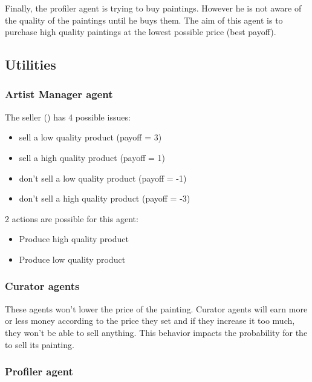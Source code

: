\documentclass[a4paper,11pt]{article}
\begin{document}
  Finally, the profiler agent is trying to buy paintings. However he is not aware of the 
  quality of the paintings until he buys them. The aim of this agent is to purchase high quality 
  paintings at the lowest possible price (best payoff).

  \subsection{Utilities}

  \subsubsection{Artist Manager agent}
  
  The seller (\am{}) has 4 possible issues:
  \begin{itemize}
   \item sell a low quality product (payoff = 3)
   \item sell a high quality product (payoff = 1)
   \item don't sell a low quality product (payoff = -1)
   \item don't sell a high quality product (payoff = -3)
  \end{itemize}
  
  2 actions are possible for this agent:
  \begin{itemize}
   \item Produce high quality product
   \item Produce low quality product
  \end{itemize}
  
  \subsubsection{Curator agents}

  These agents won't lower the price of the painting.
  Curator agents will earn more or less money according to the price they set and if 
  they increase it too much, they won't be able to sell anything. This behavior 
  impacts the probability for the \am{} to sell its painting.
  
  
  \subsubsection{Profiler agent}
  
\end{document}
